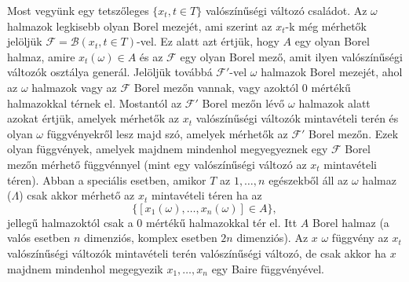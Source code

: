 \documentclass{article}
\begin{document}
Most vegyünk egy tetszőleges $\{x_t, t \in T\}$ valószínűségi változó családot. Az $\omega$ halmazok legkisebb olyan Borel mezejét, ami szerint az $x_t$-k még mérhetők jelöljük $\mathscr{F} = \mathscr{B}(x_t, t \in T)$-vel. Ez alatt azt értjük, hogy $A$ egy olyan Borel halmaz, amire $x_t(\omega) \in A$ és az $\mathscr{F}$ egy olyan Borel mező, amit ilyen valószínűségi változók osztálya generál. Jelöljük továbbá $\mathscr{F}'$-vel $\omega$ halmazok Borel mezejét, ahol az $\omega$ halmazok vagy az $\mathscr{F}$ Borel mezőn vannak, vagy azoktól $0$ mértékű halmazokkal térnek el. Mostantól az $\mathscr{F}'$ Borel mezőn lévő $\omega$ halmazok alatt azokat értjük, amelyek mérhetők az $x_t$ valószínűségi változók mintavételi terén és olyan $\omega$ függvényekről lesz majd szó, amelyek mérhetők az $\mathscr{F}'$ Borel mezőn. Ezek olyan függvények, amelyek majdnem mindenhol megyegyeznek egy $\mathscr{F}$ Borel mezőn mérhető függvénnyel (mint egy valószínűségi változó az $x_t$ mintavételi téren). Abban a speciális esetben, amikor $T$ az $1,\ldots,n$ egészekből áll az $\omega$ halmaz ($\Lambda$) csak akkor mérhető az $x_t$ mintavételi téren ha az
\[
	\{[x_1(\omega),\ldots,x_n(\omega)] \in A\},
\]
jellegű halmazoktól csak a $0$ mértékű halmazokkal tér el. Itt $A$ Borel halmaz (a valós esetben $n$ dimenziós, komplex esetben $2n$ dimenziós). Az $x$ $\omega$ függvény az $x_t$ valószínűségi változók mintavételi terén valószínűségi változó, de csak akkor ha $x$ majdnem mindenhol megegyezik $x_1,\ldots,x_n$ egy Baire függvényével. 
\end{document}

